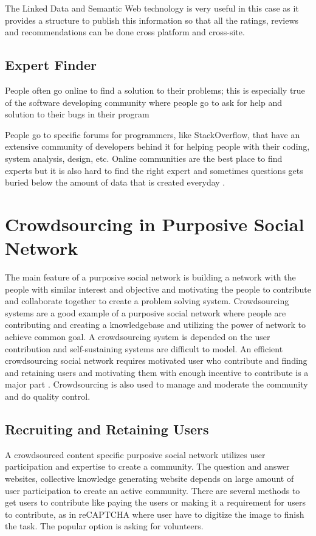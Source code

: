 The Linked Data and Semantic Web technology is very useful in this case as it provides a structure to publish this information so that all the ratings, reviews and recommendations can be done cross platform and cross-site.


\subsection{Expert Finder}

People often go online to find a solution to their problems; this is especially true of the software developing community where people go to ask for help and solution to their bugs in their program

People go to specific forums for programmers, like StackOverflow, that have an extensive community of developers behind it for helping people with their coding, system analysis, design, etc. Online communities are the best place to find experts but it is also hard to find the right expert and sometimes questions gets buried below the amount of data that is created everyday \cite{evans2008towards}.


\section{Crowdsourcing in Purposive Social Network}

The main feature of a purposive social network is building a network with the people with similar interest and objective and motivating the people to contribute and collaborate together to create a problem solving system. Crowdsourcing systems are a good example of a purposive social network where people are contributing and creating a knowledgebase and utilizing the power of network to achieve common goal. A crowdsourcing system is depended on the user contribution and self-sustaining systems are difficult to model. An efficient crowdsourcing social network requires motivated user who contribute and finding and retaining users and motivating them with enough incentive to contribute is a major part \cite{treude2011programmers}. Crowdsourcing is also used to manage and moderate the community and do quality control.


\subsection{Recruiting and Retaining Users}

A crowdsourced content specific purposive social network utilizes user participation and expertise to create a community. The question and answer websites, collective knowledge generating website depends on large amount of user participation to create an active community. There are several methods to get users to contribute like paying the users or making it a requirement for users to contribute, as in reCAPTCHA where user have to digitize the image to finish the task. The popular option is asking for volunteers.

